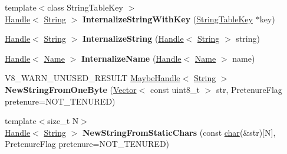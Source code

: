 \begin{DoxyCompactItemize}
\mbox{\label{classv8_1_1internal_1_1Factory_a4917d7f1755493f548430aad37c0ce5a}} 
{\footnotesize template$<$class String\+Table\+Key $>$ }\\\mbox{\hyperlink{classv8_1_1internal_1_1Handle}{Handle}}$<$ \mbox{\hyperlink{classv8_1_1internal_1_1String}{String}} $>$ {\bfseries Internalize\+String\+With\+Key} (\mbox{\hyperlink{classv8_1_1internal_1_1StringTableKey}{String\+Table\+Key}} $\ast$key)
\item 
\mbox{\label{classv8_1_1internal_1_1Factory_a6fc8eb25b0bf2a256cae661c6da709f1}} 
\mbox{\hyperlink{classv8_1_1internal_1_1Handle}{Handle}}$<$ \mbox{\hyperlink{classv8_1_1internal_1_1String}{String}} $>$ {\bfseries Internalize\+String} (\mbox{\hyperlink{classv8_1_1internal_1_1Handle}{Handle}}$<$ \mbox{\hyperlink{classv8_1_1internal_1_1String}{String}} $>$ string)
\item 
\mbox{\label{classv8_1_1internal_1_1Factory_ae94acc3f5b643d457bfcd98b2dc75453}} 
\mbox{\hyperlink{classv8_1_1internal_1_1Handle}{Handle}}$<$ \mbox{\hyperlink{classv8_1_1internal_1_1Name}{Name}} $>$ {\bfseries Internalize\+Name} (\mbox{\hyperlink{classv8_1_1internal_1_1Handle}{Handle}}$<$ \mbox{\hyperlink{classv8_1_1internal_1_1Name}{Name}} $>$ name)
\item 
\mbox{\label{classv8_1_1internal_1_1Factory_a89de8fdfb8c5f0d5f787adcde8e0e405}} 
V8\+\_\+\+W\+A\+R\+N\+\_\+\+U\+N\+U\+S\+E\+D\+\_\+\+R\+E\+S\+U\+LT \mbox{\hyperlink{classv8_1_1internal_1_1MaybeHandle}{Maybe\+Handle}}$<$ \mbox{\hyperlink{classv8_1_1internal_1_1String}{String}} $>$ {\bfseries New\+String\+From\+One\+Byte} (\mbox{\hyperlink{classv8_1_1internal_1_1Vector}{Vector}}$<$ const uint8\+\_\+t $>$ str, Pretenure\+Flag pretenure=N\+O\+T\+\_\+\+T\+E\+N\+U\+R\+ED)
\item 
\mbox{\label{classv8_1_1internal_1_1Factory_a6a46835b8b92cc0f40c98e15c2a3cfae}} 
{\footnotesize template$<$size\+\_\+t N$>$ }\\\mbox{\hyperlink{classv8_1_1internal_1_1Handle}{Handle}}$<$ \mbox{\hyperlink{classv8_1_1internal_1_1String}{String}} $>$ {\bfseries New\+String\+From\+Static\+Chars} (const \mbox{\hyperlink{classchar}{char}}(\&str)\mbox{[}N\mbox{]}, Pretenure\+Flag pretenure=N\+O\+T\+\_\+\+T\+E\+N\+U\+R\+ED)

\end{DoxyCompactItemize}

